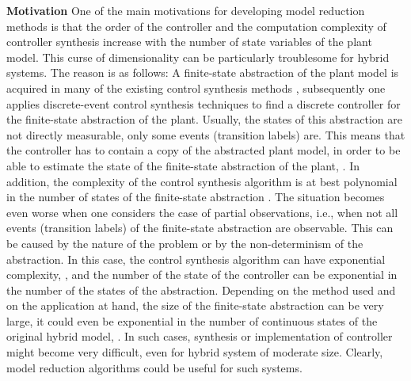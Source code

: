 \documentclass[journal]{IEEEtran}
\begin{document}
\textbf{Motivation}
One of the main motivations for developing model reduction methods is that the order of the controller and the computation complexity of controller synthesis increase with the number of state variables of the plant model. This curse of dimensionality can be particularly troublesome for hybrid systems. The reason is as follows: A finite-state abstraction of the plant model is acquired in many of the existing control synthesis methods \cite{TabuadaBook}, subsequently one applies discrete-event control synthesis techniques to find a discrete controller for the finite-state abstraction of the plant. Usually, the states of this abstraction are not directly measurable, only some events (transition labels) are. This means that the controller has to contain a copy of the abstracted plant model, in order to be able to estimate the state of the finite-state abstraction of the plant, \cite{TabuadaBook,Wonham3,VardKupfContr}. In addition, the complexity of the control synthesis algorithm is at best polynomial in the number of states of the finite-state abstraction \cite{TabuadaBook,Wonham3,GameBook}. The situation becomes even worse when one considers the case of partial observations, i.e., when not all events (transition labels) of the finite-state abstraction are observable. This can be caused by the nature of the problem \cite{MP:HybIoDADHS09} or by the non-determinism of the abstraction. In this case, the control synthesis algorithm can have exponential complexity, \cite{GameBook,arnold_games_2003,Wonham3}, and the number of the state of the controller can be exponential in the number of the states of the abstraction. Depending on the method used and on the application at hand, the size of the finite-state abstraction can be very large, it could even be exponential in the number of continuous states of the original hybrid model, \cite{TabuadaBook}. In such cases, synthesis or implementation of controller might become very difficult, even for hybrid system of moderate size. Clearly, model reduction algorithms could be useful for such systems.
\end{document}
